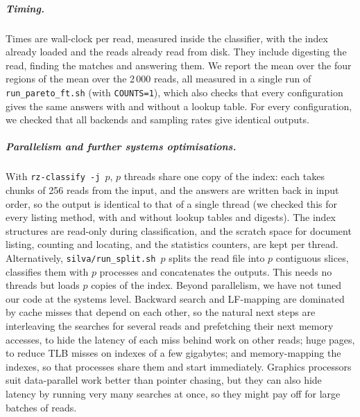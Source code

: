 \subparagraph*{Timing.}
Times are wall-clock per read, measured inside the classifier, with the index already loaded and the reads already read from disk.
They include digesting the read, finding the matches and answering them.
We report the mean over the four regions of the mean over the 2\,000 reads, all measured in a single run of \texttt{run\_pareto\_ft.sh} (with \texttt{COUNTS=1}), which also checks that every configuration gives the same answers with and without a lookup table.
For every configuration, we checked that all backends and sampling rates give identical outputs.

\subparagraph*{Parallelism and further systems optimisations.}
With \texttt{rz-classify -j}~$p$, $p$ threads share one copy of the index: each takes chunks of 256 reads from the input, and the answers are written back in input order, so the output is identical to that of a single thread (we checked this for every listing method, with and without lookup tables and digests).
The index structures are read-only during classification, and the scratch space for document listing, counting and locating, and the statistics counters, are kept per thread.
Alternatively, \texttt{silva/run\_split.sh}~$p$ splits the read file into $p$ contiguous slices, classifies them with $p$ processes and concatenates the outputs.
This needs no threads but loads $p$ copies of the index.
Beyond parallelism, we have not tuned our code at the systems level.
Backward search and LF-mapping are dominated by cache misses that depend on each other, so the natural next steps are interleaving the searches for several reads and prefetching their next memory accesses, to hide the latency of each miss behind work on other reads; huge pages, to reduce TLB misses on indexes of a few gigabytes; and memory-mapping the indexes, so that processes share them and start immediately.
Graphics processors suit data-parallel work better than pointer chasing, but they can also hide latency by running very many searches at once, so they might pay off for large batches of reads.

